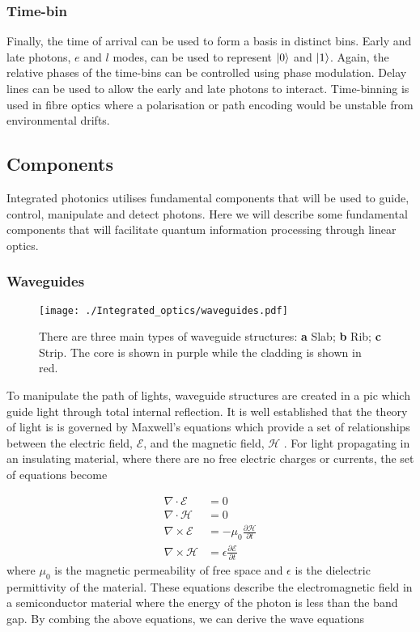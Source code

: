 \subsubsection*{Time-bin}

Finally, the time of arrival can be used to form a basis in distinct bins. Early and late photons, $e$ and $l$ modes, can be used to represent $\ket{0}$ and $\ket{1}$. Again, the relative phases of the time-bins can be controlled using phase modulation. Delay lines can be used to allow the early and late photons to interact. Time-binning is used in fibre optics where a polarisation or path encoding would be unstable from environmental drifts.

\subsection{Components}

Integrated photonics utilises fundamental components that will be used to guide, control, manipulate and detect photons. Here we will describe some fundamental components that will facilitate quantum information processing through linear optics.

\subsubsection*{Waveguides}

\begin{figure}[t]
	\centering
	\texttt{[image: ./Integrated\_optics/waveguides.pdf]}
	\caption[Main types of waveguide structures]{There are three main types of waveguide structures:  \textbf{a} Slab; \textbf{b} Rib; \textbf{c} Strip. The core is shown in purple while the cladding is shown in red.}
	\label{fig:waveguides}
\end{figure}

To manipulate the path of lights, waveguide structures are created in a \ac{pic} which guide light through total internal reflection. It is well established that the theory of light is is governed by Maxwell's equations which provide a set of relationships between the electric field, $\mathcal{E}$, and the magnetic field, $\mathcal{H}$ \cite{lifante2003integrated}. For light propagating in an insulating material, where there are no free electric charges or currents, the set of equations become

\begin{align}
	\nabla\cdot\mathcal{E} &= 0\\
	\nabla\cdot\mathcal{H} &= 0\\
	\nabla\times\mathcal{E} &= -\mu_0\frac{\partial\mathcal{H}}{\partial t}\\
	\nabla\times\mathcal{H} &= \epsilon\frac{\partial\mathcal{E}}{\partial t}
\end{align}
where $\mu_0$ is the magnetic permeability of free space and $\epsilon$ is the dielectric permittivity of the material. These equations describe the electromagnetic field in a semiconductor material where the energy of the photon is less than the band gap. By combing the above equations, we can derive the wave equations

